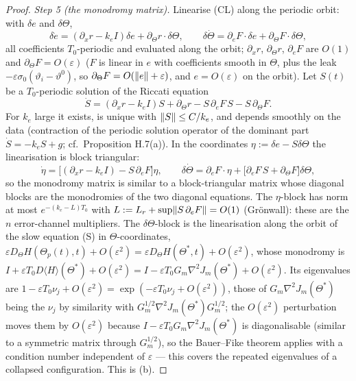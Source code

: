 \begin{proof}
\smallskip
\emph{Step 5 (the monodromy matrix).} Linearise \textup{(CL)} along the periodic orbit: with $\delta e$ and
$\delta\Theta$,
\[
  \delta\dot e = (\partial_xr - k_eI)\delta e + \partial_\Theta r\cdot\delta\Theta,\qquad
  \delta\dot\Theta = \partial_eF\cdot\delta e + \partial_\Theta F\cdot\delta\Theta,
\]
all coefficients $T_0$-periodic and evaluated along the orbit; $\partial_xr$, $\partial_\Theta r$, $\partial_eF$ are
$O(1)$ and $\partial_\Theta F = O(\varepsilon)$ ($F$ is linear in $e$ with coefficients smooth in $\Theta$, plus the
leak $-\varepsilon\sigma_0(\vartheta_i - \vartheta^0)$, so $\partial_\Theta F = O(\lVert e\rVert + \varepsilon)$, and
$e = O(\varepsilon)$ on the orbit). Let $S(t)$ be a $T_0$-periodic solution of the Riccati equation
\[
  \dot S = (\partial_xr - k_eI)S + \partial_\Theta r - S\,\partial_eF\,S - S\,\partial_\Theta F.
\]
For $k_e$ large it exists, is unique with $\lVert S\rVert \le C/k_e$, and depends smoothly on the data (contraction of the
periodic solution operator of the dominant part $\dot S = -k_eS + g$; cf.\ Proposition H.7(a)). In the coordinates
$\eta := \delta e - S\delta\Theta$ the linearisation is block triangular:
\[
  \dot\eta = \bigl[(\partial_xr - k_eI) - S\,\partial_eF\bigr]\eta,\qquad
  \delta\dot\Theta = \partial_eF\cdot\eta + \bigl[\partial_eF\,S + \partial_\Theta F\bigr]\delta\Theta,
\]
so the monodromy matrix is similar to a block-triangular matrix whose diagonal blocks are the monodromies of the two
diagonal equations. The $\eta$-block has norm at most $e^{-(k_e - L)T_0}$ with
$L := L_r + \sup\lVert S\,\partial_eF\rVert = O(1)$ (Grönwall): these are the $n$ error-channel multipliers. The
$\delta\Theta$-block is the linearisation along the orbit of the slow equation \textup{(S)} in $\Theta$-coordinates,
$\varepsilon D_\Theta H(\Theta_p(t),t) + O(\varepsilon^2) = \varepsilon D_\Theta H(\Theta^*,t) + O(\varepsilon^2)$, whose
monodromy is $I + \varepsilon T_0D\langle H\rangle(\Theta^*) + O(\varepsilon^2)
= I - \varepsilon T_0G_m\nabla^2J_m(\Theta^*) + O(\varepsilon^2)$. Its eigenvalues are
$1 - \varepsilon T_0\nu_j + O(\varepsilon^2) = \exp(-\varepsilon T_0\nu_j + O(\varepsilon^2))$, those of
$G_m\nabla^2J_m(\Theta^*)$ being the $\nu_j$ by similarity with $G_m^{1/2}\nabla^2J_m(\Theta^*)G_m^{1/2}$; the
$O(\varepsilon^2)$ perturbation moves them by $O(\varepsilon^2)$ because $I - \varepsilon T_0G_m\nabla^2J_m(\Theta^*)$
is diagonalisable (similar to a symmetric matrix through $G_m^{1/2}$), so the Bauer--Fike theorem applies with a
condition number independent of $\varepsilon$ --- this covers the repeated eigenvalues of a collapsed configuration.
This is \textup{(b)}.


\end{proof}
